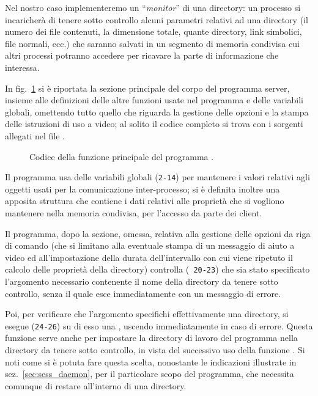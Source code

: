 Nel nostro caso implementeremo un ``\textsl{monitor}'' di una directory: un
processo si incaricherà di tenere sotto controllo alcuni parametri relativi ad
una directory (il numero dei file contenuti, la dimensione totale, quante
directory, link simbolici, file normali, ecc.) che saranno salvati in un
segmento di memoria condivisa cui altri processi potranno accedere per
ricavare la parte di informazione che interessa.

In fig.~\ref{fig:ipc_dirmonitor_main} si è riportata la sezione principale del
corpo del programma server, insieme alle definizioni delle altre funzioni
usate nel programma e delle variabili globali, omettendo tutto quello che
riguarda la gestione delle opzioni e la stampa delle istruzioni di uso a
video; al solito il codice completo si trova con i sorgenti allegati nel file
.

\begin{figure}[!htbp]
  \footnotesize \centering
  \begin{minipage}[c]{\codesamplewidth}
  \end{minipage} 
  \normalsize 
  \caption{Codice della funzione principale del programma .}
  \label{fig:ipc_dirmonitor_main}
\end{figure}

Il programma usa delle variabili globali (\texttt{\small 2-14}) per mantenere
i valori relativi agli oggetti usati per la comunicazione inter-processo; si è
definita inoltre una apposita struttura  che contiene i dati
relativi alle proprietà che si vogliono mantenere nella memoria condivisa, per
l'accesso da parte dei client.

Il programma, dopo la sezione, omessa, relativa alla gestione delle opzioni da
riga di comando (che si limitano alla eventuale stampa di un messaggio di
aiuto a video ed all'impostazione della durata dell'intervallo con cui viene
ripetuto il calcolo delle proprietà della directory) controlla (\texttt{\small
  20-23}) che sia stato specificato l'argomento necessario contenente il nome
della directory da tenere sotto controllo, senza il quale esce immediatamente
con un messaggio di errore.

Poi, per verificare che l'argomento specifichi effettivamente una directory,
si esegue (\texttt{\small 24-26}) su di esso una , uscendo
immediatamente in caso di errore.  Questa funzione serve anche per impostare
la directory di lavoro del programma nella directory da tenere sotto
controllo, in vista del successivo uso della funzione . Si noti
come si è potuta fare questa scelta, nonostante le indicazioni illustrate in
sez.~\ref{sec:sess_daemon}, per il particolare scopo del programma, che
necessita comunque di restare all'interno di una directory.

